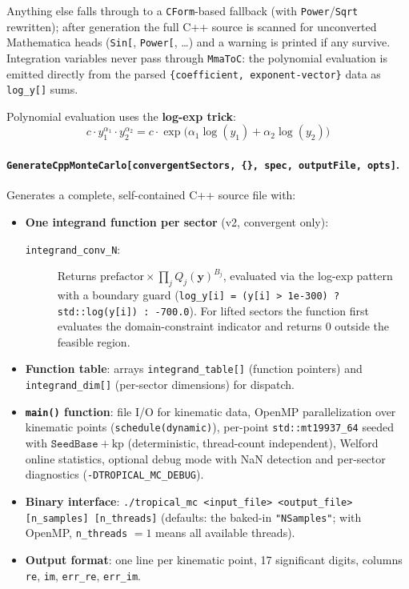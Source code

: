 \documentclass[11pt,a4paper]{article}
\begin{document}
Anything else falls through to a \texttt{CForm}-based fallback (with
\texttt{Power}/\texttt{Sqrt} rewritten); after generation the full C++ source
is scanned for unconverted Mathematica heads (\texttt{Sin[}, \texttt{Power[},
\ldots) and a warning is printed if any survive. Integration variables never
pass through \texttt{MmaToC}: the polynomial evaluation is emitted directly
from the parsed \texttt{\{coefficient, exponent-vector\}} data as
\texttt{log\_y[]} sums.

Polynomial evaluation uses the \textbf{log-exp trick}:
\begin{equation}
c \cdot y_1^{\alpha_1} \cdot y_2^{\alpha_2} = c \cdot \exp\bigl(\alpha_1 \log(y_1) + \alpha_2 \log(y_2)\bigr)
\end{equation}

\paragraph{\texttt{GenerateCppMonteCarlo[convergentSectors, \{\}, spec, outputFile, opts]}.} Generates a complete, self-contained C++ source file with:

\begin{itemize}
  \item \textbf{One integrand function per sector} (v2, convergent only):
    \begin{description}
      \item[\texttt{integrand\_conv\_N}:] Returns $\mathrm{prefactor} \times \prod_j Q_j(\mathbf{y})^{B_j}$, evaluated via the log-exp pattern with a boundary guard (\texttt{log\_y[i] = (y[i] > 1e-300) ? std::log(y[i]) : -700.0}). For lifted sectors the function first evaluates the domain-constraint indicator and returns $0$ outside the feasible region.
    \end{description}
  \item \textbf{Function table}: arrays \texttt{integrand\_table[]} (function pointers) and \texttt{integrand\_dim[]} (per-sector dimensions) for dispatch.
  \item \textbf{\texttt{main()} function}: file I/O for kinematic data, OpenMP parallelization over kinematic points (\texttt{schedule(dynamic)}), per-point \texttt{std::mt19937\_64} seeded with $\texttt{SeedBase} + \mathrm{kp}$ (deterministic, thread-count independent), Welford online statistics, optional debug mode with NaN detection and per-sector diagnostics (\texttt{-DTROPICAL\_MC\_DEBUG}).
  \item \textbf{Binary interface}: \texttt{./tropical\_mc <input\_file> <output\_file> [n\_samples] [n\_threads]} (defaults: the baked-in \texttt{"NSamples"}; with OpenMP, \texttt{n\_threads} $=1$ means all available threads).
  \item \textbf{Output format}: one line per kinematic point, 17 significant digits, columns \texttt{re}, \texttt{im}, \texttt{err\_re}, \texttt{err\_im}.
\end{itemize}
\end{document}
